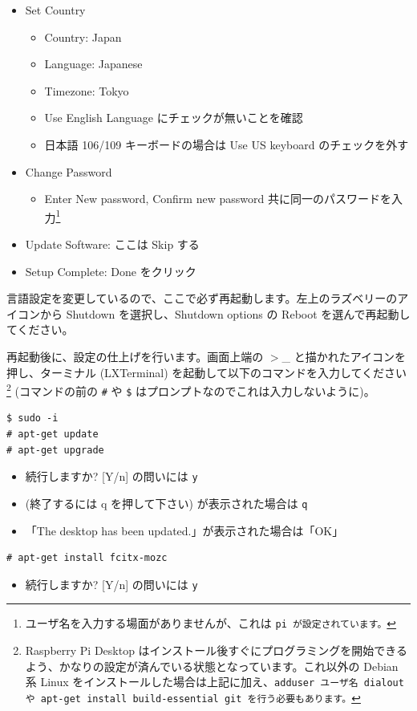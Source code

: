 \documentclass[a4j,oneside]{ujbook}
\begin{document}
\begin{itemize}
 \item Set Country
  \begin{itemize}
   \item Country: Japan
   \item Language: Japanese
   \item Timezone: Tokyo
   \item Use English Language にチェックが無いことを確認
   \item 日本語 106/109 キーボードの場合は Use US keyboard のチェックを外す
  \end{itemize}
  \item Change Password
  \begin{itemize}
   \item Enter New password, Confirm new password 共に同一のパスワードを入力\footnote{ユーザ名を入力する場面がありませんが、これは \tt{pi} が設定されています。}
  \end{itemize}
  \item Update Software: ここは Skip する
  \item Setup Complete: Done をクリック
\end{itemize}

言語設定を変更しているので、ここで必ず再起動します。左上のラズベリーのアイコンから Shutdown を選択し、Shutdown options の Reboot を選んで再起動してください。

再起動後に、設定の仕上げを行います。画面上端の $>$\_ と描かれたアイコンを押し、ターミナル (LXTerminal) を起動して以下のコマンドを入力してください\footnote{Raspberry Pi Desktop はインストール後すぐにプログラミングを開始できるよう、かなりの設定が済んでいる状態となっています。これ以外の Debian 系 Linux をインストールした場合は上記に加え、\tt{adduser ユーザ名 dialout} や \tt{apt-get install build-essential git} を行う必要もあります。} (コマンドの前の \verb+#+ や \verb+$+ はプロンプトなのでこれは入力しないように)。

\begin{verbatim}
$ sudo -i
# apt-get update
# apt-get upgrade
\end{verbatim}
\begin{itemize}
 \renewcommand{\labelitemi}{$\triangleright$}
 \item 続行しますか? [Y/n] の問いには \verb+y+
 \item (終了するには q を押して下さい) が表示された場合は \verb+q+
 \item 「The desktop has been updated.」が表示された場合は「OK」
\end{itemize}
\begin{verbatim}
# apt-get install fcitx-mozc
\end{verbatim}
\begin{itemize}
 \renewcommand{\labelitemi}{$\triangleright$}
 \item 続行しますか? [Y/n] の問いには \verb+y+
\end{itemize}
\end{document}
